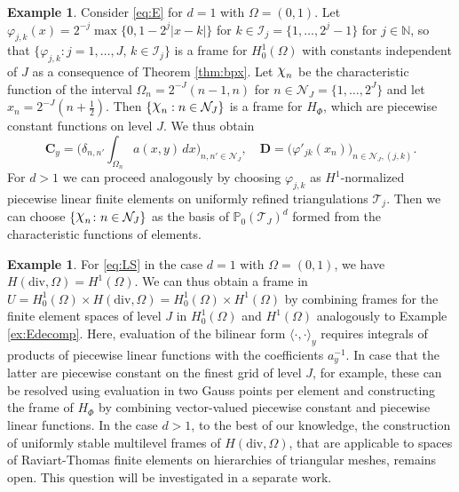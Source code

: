 \documentclass[a4paper,11pt]{amsart}
\providecommand{\abs}[1]{\lvert#1\rvert}
\numberwithin{equation}{section}
\theoremstyle{definition}
\newtheorem{example}[theorem]{Example}
\theoremstyle{remark}
\theoremstyle{plain}
\newcommand{\N}{\mathbb{N}}
\newcommand{\Chi}{\raise .3ex
\hbox{\large $\chi$}}
\begin{document}
\begin{example}\label{ex:Edecomp}
Consider \eqref{eq:E} for $d=1$ with $\Omega = (0,1)$. Let $\varphi_{j,k}(x) = 2^{-j} \max\{ 0, 1 -  2^j \abs{x - k} \}$ for $k \in \mathcal{I}_j = \{ 1, \ldots, 2^j - 1\}$ for $j \in \N$, so that $\{ \varphi_{j,k}\colon j = 1,\ldots, J, \, k \in \mathcal{I}_j\}$ is a frame for $H^1_0(\Omega)$ with constants independent of $J$ as a consequence of Theorem \ref{thm:bpx}.
Let $\Chi_n$ be the characteristic function of the interval $\Omega_n = 2^{-J}(n-1, n)$ for $n \in \mathcal N_J = \{ 1, \ldots, 2^J\}$ and let $x_n = 2^{-J}(n + \frac12)$.
Then $\{\Chi_n : n\in \mathcal N_J\}$ is a frame for $H_\Phi$, which are piecewise constant functions on level $J$.
We thus obtain
\[
  \mathbf C_y = \biggl( \delta_{n,n'} \int_{\Omega_n} a(x,y) \,dx \biggr)_{n, n' \in \mathcal N_J}, \quad \mathbf D = \bigl( \varphi'_{jk}(x_n) \bigr)_{n \in \mathcal N_J, (j,k)}.
\]
For $d>1$ we can proceed analogously by choosing $\varphi_{j,k}$ as $H^1$-normalized piecewise linear finite elements on uniformly refined triangulations $\mathcal T_j$. Then we can choose $\{ \Chi_n \colon n \in \mathcal N_J\}$ as the basis of $\mathbb P_0(\mathcal T_J)^d$ formed from the characteristic functions of elements.
\end{example}

\begin{example}
For \eqref{eq:LS} in the case $d=1$ with $\Omega=(0,1)$, we have $H(\mathrm{div},\Omega) = H^1(\Omega)$. We can thus obtain a frame in $U = H^1_0(\Omega) \times H(\mathrm{div},\Omega) = H^1_0(\Omega)\times H^1(\Omega)$ by combining frames for the finite element spaces of level $J$ in $H^1_0(\Omega)$ and $H^1(\Omega)$ analogously to Example \eqref{ex:Edecomp}. Here, evaluation of the bilinear form $\langle \cdot, \cdot \rangle_y$ requires integrals of products of piecewise linear functions with the coefficients $a_y^{-1}$. In case that the latter are piecewise constant on the finest grid of level $J$, for example, these can be resolved using evaluation in two Gauss points per element and constructing the frame of $H_\Phi$ by combining vector-valued piecewise constant and piecewise linear functions.
In the case $d>1$, to the best of our knowledge, the construction of uniformly stable 
multilevel frames of $H(\mathrm{div},\Omega)$, that are applicable to spaces of Raviart-Thomas finite elements on hierarchies of triangular meshes, remains open. This question will be investigated in a separate work. 
\end{example}
\end{document}
